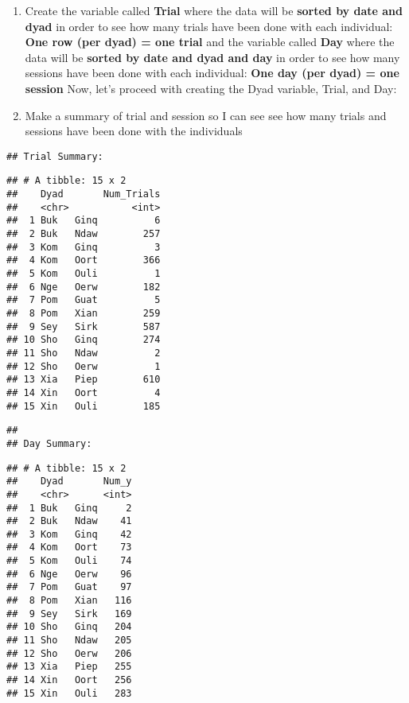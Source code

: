 \documentclass[
]{article}
\begin{document}
\begin{enumerate}
\def\labelenumi{\arabic{enumi}.}
\setcounter{enumi}{2}
\item
  Create the variable called \textbf{Trial} where the data will be
  \textbf{sorted by date and dyad} in order to see how many trials have
  been done with each individual: \textbf{One row (per dyad) = one
  trial} and the variable called \textbf{Day} where the data will be
  \textbf{sorted by date and dyad and day} in order to see how many
  sessions have been done with each individual: \textbf{One day (per
  dyad) = one session} Now, let's proceed with creating the Dyad
  variable, Trial, and Day:
\item
  Make a summary of trial and session so I can see see how many trials
  and sessions have been done with the individuals
\end{enumerate}

\begin{verbatim}
## Trial Summary:
\end{verbatim}

\begin{verbatim}
## # A tibble: 15 x 2
##    Dyad       Num_Trials
##    <chr>           <int>
##  1 Buk   Ginq          6
##  2 Buk   Ndaw        257
##  3 Kom   Ginq          3
##  4 Kom   Oort        366
##  5 Kom   Ouli          1
##  6 Nge   Oerw        182
##  7 Pom   Guat          5
##  8 Pom   Xian        259
##  9 Sey   Sirk        587
## 10 Sho   Ginq        274
## 11 Sho   Ndaw          2
## 12 Sho   Oerw          1
## 13 Xia   Piep        610
## 14 Xin   Oort          4
## 15 Xin   Ouli        185
\end{verbatim}

\begin{verbatim}
## 
## Day Summary:
\end{verbatim}

\begin{verbatim}
## # A tibble: 15 x 2
##    Dyad       Num_y
##    <chr>      <int>
##  1 Buk   Ginq     2
##  2 Buk   Ndaw    41
##  3 Kom   Ginq    42
##  4 Kom   Oort    73
##  5 Kom   Ouli    74
##  6 Nge   Oerw    96
##  7 Pom   Guat    97
##  8 Pom   Xian   116
##  9 Sey   Sirk   169
## 10 Sho   Ginq   204
## 11 Sho   Ndaw   205
## 12 Sho   Oerw   206
## 13 Xia   Piep   255
## 14 Xin   Oort   256
## 15 Xin   Ouli   283
\end{verbatim}
\end{document}
